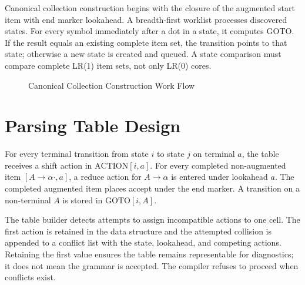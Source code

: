 \documentclass[12pt,a4paper,oneside]{report}
\begin{document}
Canonical collection construction begins with the closure of the augmented start item with end marker lookahead. A breadth-first worklist processes discovered states. For every symbol immediately after a dot in a state, it computes GOTO. If the result equals an existing complete item set, the transition points to that state; otherwise a new state is created and queued. A state comparison must compare complete LR(1) item sets, not only LR(0) cores.

\begin{figure}[H]
\centering
{}
\caption{Canonical Collection Construction Work Flow}
\label{fig:canonical-workflow}
\end{figure}

\section{Parsing Table Design}
For every terminal transition from state $i$ to state $j$ on terminal $a$, the table receives a shift action in $\mathrm{ACTION}[i,a]$. For every completed non-augmented item $[A\to\alpha\cdot,a]$, a reduce action for $A\to\alpha$ is entered under lookahead $a$. The completed augmented item places accept under the end marker. A transition on a non-terminal $A$ is stored in $\mathrm{GOTO}[i,A]$.

The table builder detects attempts to assign incompatible actions to one cell. The first action is retained in the data structure and the attempted collision is appended to a conflict list with the state, lookahead, and competing actions. Retaining the first value ensures the table remains representable for diagnostics; it does not mean the grammar is accepted. The compiler refuses to proceed when conflicts exist.
\end{document}
